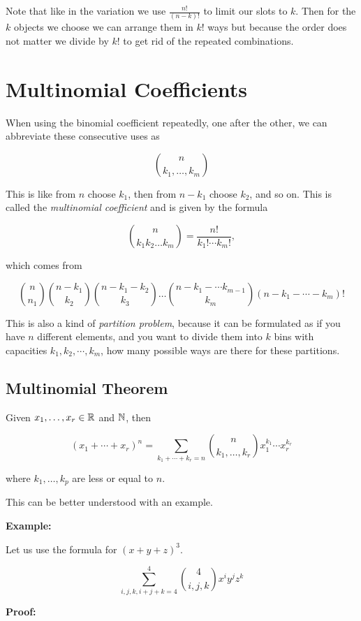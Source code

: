 Note that like in the variation we use \(\frac{n!}{(n - k)!}\) to limit our slots to \(k\). Then for the \(k\) objects
we choose we can arrange them in \(k!\) ways but because the order does not matter we divide by \(k!\) to get rid of the
repeated combinations.

\section{Multinomial Coefficients}

When using the binomial coefficient repeatedly, one after the other, we can abbreviate
these consecutive uses as

\[
	\binom{n}{k_1, \dots, k_m}
\]

This is like from \(n\) choose \(k_1\), then from \(n - k_1\) choose \(k_2\), and so on. This is called
the \emph{multinomial coefficient} and is given by the formula

\[
	\binom{n}{k_1 k_2 \dots k_m} = \frac{n!}{k_1! \cdots k_m!},
\]

which comes from

\[
	\binom{n}{n_1} \binom{n - k_1}{k_2}\binom{n - k_1 - k_2}{k_3} \dots \binom{n - k_1 - \cdots k_{m - 1}}{k_m} (n - k_1 - \cdots - k_m)!
\]

This is also a kind of \emph{partition problem}, because it can be formulated as if you have
\(n\) different elements, and you want to divide them into \(k\) bins with capacities \(k_1, k_2, \cdots, k_m\), how
many possible ways are there for these partitions.

\subsection{Multinomial Theorem}

Given \(x_1, \dots, x_r \in \mathbb{R}\) and \(\mathbb{N}\), then

\[
	(x_1 + \cdots + x_r)^n = \sum_{k_1 + \cdots + k_{r} = n}  \binom{n}{k_1, \dots, k_r} x_{1}^{k_1} \cdots x_{r}^{k_r}
\]

where \(k_1, \dots, k_p\) are less or equal to \(n\).

This can be better understood with an example.

\textbf{Example:}

Let us use the formula for \((x + y + z)^3\).


\[
	\sum_{i, j, k, i + j + k = 4}^{4} \binom{4}{i, j, k}x^i y^j z^k
\]

\textbf{Proof:}

